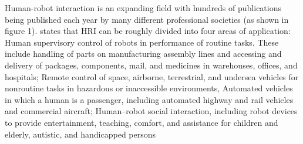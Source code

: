 \documentclass[conference]{IEEEtran}
\begin{document}
Human-robot interaction is an expanding field with hundreds of publications being published each year by many different professional societies (as shown in figure 1). \textcite{sheridan2016human} states  that HRI can be roughly divided into four areas of application: Human supervisory control of robots in performance of routine tasks. These include handling of parts on manufacturing assembly lines and accessing and delivery of packages, components, mail, and medicines in warehouses, offices, and hospitals; Remote control of space, airborne, terrestrial, and undersea vehicles for nonroutine tasks in hazardous or inaccessible environments, Automated vehicles in which a human is a passenger, including automated highway and rail vehicles and commercial aircraft; Human–robot social interaction, including robot devices to provide entertainment, teaching, comfort, and assistance for children and elderly, autistic, and handicapped persons  
\end{document}
